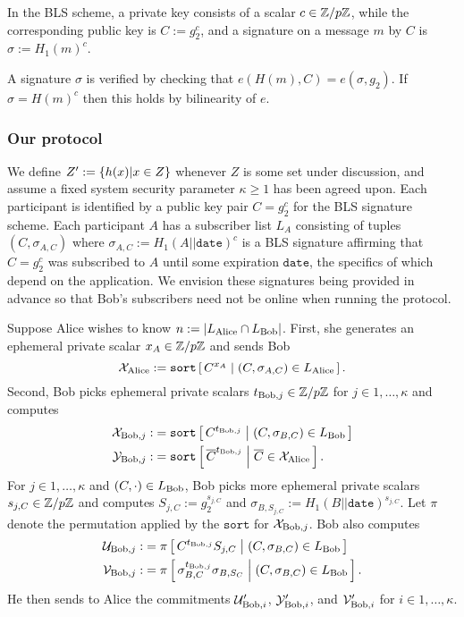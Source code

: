 \documentclass{article}
\begin{document}
In the BLS scheme, a private key consists of a scalar $c \in \mathbb{Z}/p\mathbb{Z}$,
while the corresponding public key is $C := g_2^c$, and a signature on
a message $m$ by $C$ is $\sigma := H_1(m)^c$.

A signature $\sigma$ is verified by checking that $e(H(m),C) =
e(\sigma,g_2)$.  If $\sigma = H(m)^c$ then this holds by bilinearity
of $e$.

\subsubsection{Our protocol}

We define $Z' := \{  h(x)  |  x \in Z  \}$
 whenever $Z$ is some set under discussion, and assume a fixed
system security parameter $\kappa \ge 1$ has been agreed upon.
Each participant is identified by a public key pair $C = g_2^c$
for the BLS signature scheme.  Each participant $A$ has a subscriber
list $L_A$ consisting of tuples $(C,\sigma_{A,C})$ where
$\sigma_{A,C} := H_1(A||\texttt{date})^c$ is a BLS signature affirming
that $C = g_2^c$ was subscribed to $A$ until some expiration
$\texttt{date}$, the specifics of which depend on the application.
We envision these signatures being provided in advance so that Bob's
subscribers need not be online when running the protocol.

Suppose Alice wishes to know $n := |L_{\textrm{Alice}} \cap L_{\textrm{Bob}}|$.
First, she generates an ephemeral private scalar $x_A \in
\mathbb{Z}/p\mathbb{Z}$ and sends Bob
\begin{equation}
{\cal X}_\Alice := \texttt{sort}
  \Listst{ C^{x_A} }{ (C, \sigma_{A,C}) \in L_\Alice }
  \mathperiod
\end{equation}
Second, Bob picks ephemeral private scalars
 $t_{{\textrm{Bob}},j} \in \mathbb{Z}/p\mathbb{Z}$ for $j \in 1,\ldots,\kappa$ and
 computes
\begin{align}
  {\cal X}_{\Bob,j} :&= \texttt{sort}
  \Listst{ C^{t_{\Bob,j}} }{ (C, \sigma_{B,C}) \in L_\Bob }  \\
  {\cal Y}_{\Bob,j} :&= \texttt{sort}
  \Listst{ \overline{C}^{t_{\Bob,j}}}{ \overline{C} \in {\cal X}_\Alice }
  \mathperiod
\end{align}
For $j \in 1,\ldots,\kappa$ and $(C,\cdot) \in L_{\textrm{Bob}}$,
Bob picks more ephemeral private scalars $s_{j,C} \in \mathbb{Z}/p\mathbb{Z}$ and
computes $S_{j,C} := g_2^{s_{j,C}}$ and
 $\sigma_{B,S_{j,C}} := H_1(B||\texttt{date})^{s_{j,C}}$.
Let $\pi$ denote the permutation applied by the $\texttt{sort}$ for ${\cal X}_{{\textrm{Bob}},j}$.
Bob also computes
\begin{align}
  {\cal U}_{\Bob,j} :&= \pi
  \Listst{ C^{t_{\Bob,j}} S_{j,C} }{ (C, \sigma_{B,C}) \in L_\Bob }  \\
  {\cal V}_{\Bob,j} :&= \pi
  \Listst{ \sigma_{B,C}^{t_{\Bob,j}} \sigma_{B,S_C} }{ (C, \sigma_{B,C}) \in L_\Bob }
  \mathperiod
\end{align}
He then sends to Alice the commitments
 ${\cal U}'_{{\textrm{Bob}},i}$, %
 ${\cal Y}'_{{\textrm{Bob}},i}$, and
 ${\cal V}'_{{\textrm{Bob}},i}$ for $i \in 1,\ldots,\kappa$.
\end{document}
